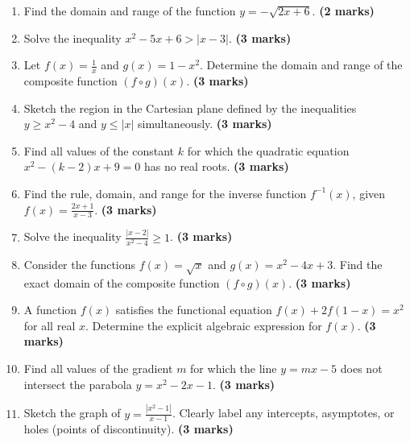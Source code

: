 \documentclass{article}
\begin{document}
\begin{enumerate}
    \item Find the domain and range of the function $y = -\sqrt{2x + 6}$. \hfill \textbf{(2 marks)}
    \vspace{0.5cm}

    \item Solve the inequality $x^2 - 5x + 6 > |x - 3|$. \hfill \textbf{(3 marks)}
    \vspace{0.5cm}

    \item Let $f(x) = \frac{1}{x}$ and $g(x) = 1 - x^2$. Determine the domain and range of the composite function $(f \circ g)(x)$. \hfill \textbf{(3 marks)}
    \vspace{0.5cm}

    \item Sketch the region in the Cartesian plane defined by the inequalities $y \ge x^2 - 4$ and $y \le |x|$ simultaneously. \hfill \textbf{(3 marks)}
    \vspace{0.5cm}

    \item Find all values of the constant $k$ for which the quadratic equation $x^2 - (k-2)x + 9 = 0$ has no real roots. \hfill \textbf{(3 marks)}
    \vspace{0.5cm}

    \item Find the rule, domain, and range for the inverse function $f^{-1}(x)$, given $f(x) = \frac{2x+1}{x-3}$. \hfill \textbf{(3 marks)}
    \vspace{0.5cm}

    \item Solve the inequality $\frac{|x - 2|}{x^2 - 4} \ge 1$. \hfill \textbf{(3 marks)}
    \vspace{0.5cm}

    \item Consider the functions $f(x) = \sqrt{x}$ and $g(x) = x^2 - 4x + 3$. Find the exact domain of the composite function $(f \circ g)(x)$. \hfill \textbf{(3 marks)}
    \vspace{0.5cm}

    \item A function $f(x)$ satisfies the functional equation $f(x) + 2f(1-x) = x^2$ for all real $x$. Determine the explicit algebraic expression for $f(x)$. \hfill \textbf{(3 marks)}
    \vspace{0.5cm}

    \item Find all values of the gradient $m$ for which the line $y = mx - 5$ does not intersect the parabola $y = x^2 - 2x - 1$. \hfill \textbf{(3 marks)}
    \vspace{0.5cm}

    \item Sketch the graph of $y = \frac{|x^2 - 1|}{x - 1}$. Clearly label any intercepts, asymptotes, or holes (points of discontinuity). \hfill \textbf{(3 marks)}
    \vspace{0.5cm}
\end{enumerate}
\end{document}
